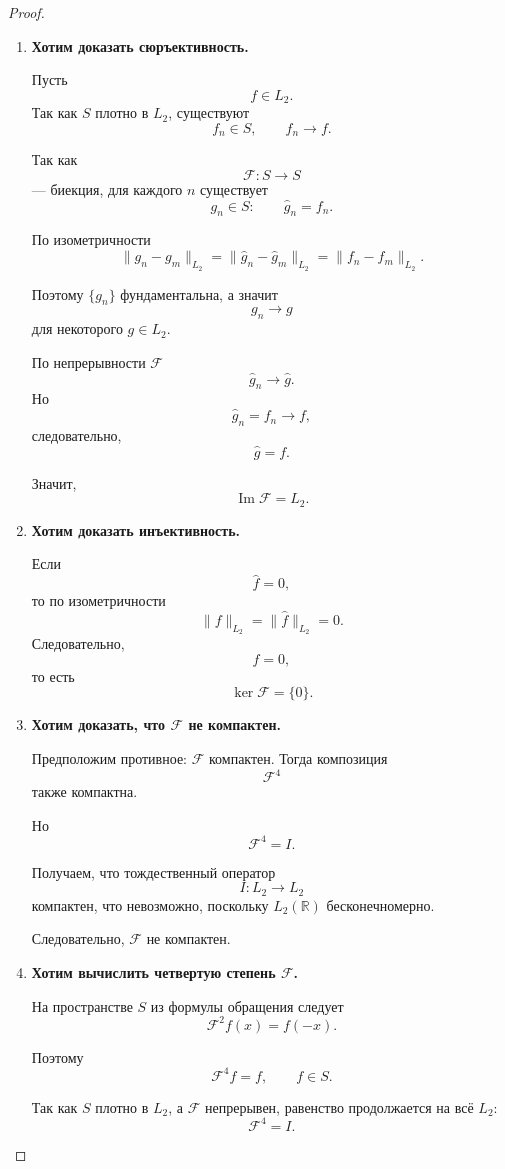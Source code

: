 \begin{proof}
	\begin{enumerate}
		\item
		\textbf{Хотим доказать сюръективность.}
		
		Пусть
		\[
		f\in L_2.
		\]
		Так как \(S\) плотно в \(L_2\), существуют
		\[
		f_n\in S,
		\qquad
		f_n\to f.
		\]
		
		Так как
		\[
		\mathcal F:S\to S
		\]
		--- биекция, для каждого \(n\) существует
		\[
		g_n\in S:
		\qquad
		\widehat g_n=f_n.
		\]
		
		По изометричности
		\[
		\|g_n-g_m\|_{L_2}
		=
		\|\widehat g_n-\widehat g_m\|_{L_2}
		=
		\|f_n-f_m\|_{L_2}.
		\]
		
		Поэтому \(\{g_n\}\) фундаментальна, а значит
		\[
		g_n\to g
		\]
		для некоторого \(g\in L_2\).
		
		По непрерывности \(\mathcal F\)
		\[
		\widehat g_n\to\widehat g.
		\]
		Но
		\[
		\widehat g_n=f_n\to f,
		\]
		следовательно,
		\[
		\widehat g=f.
		\]
		
		Значит,
		\[
		\operatorname{Im}\mathcal F=L_2.
		\]
		
		\item
		\textbf{Хотим доказать инъективность.}
		
		Если
		\[
		\widehat f=0,
		\]
		то по изометричности
		\[
		\|f\|_{L_2}
		=
		\|\widehat f\|_{L_2}
		=
		0.
		\]
		Следовательно,
		\[
		f=0,
		\]
		то есть
		\[
		\ker\mathcal F=\{0\}.
		\]
		
		\item
		\textbf{Хотим доказать, что \(\mathcal F\) не компактен.}
		
		Предположим противное: \(\mathcal F\) компактен.
		Тогда композиция
		\[
		\mathcal F^4
		\]
		также компактна.
		
		Но
		\[
		\mathcal F^4=I.
		\]
		
		Получаем, что тождественный оператор
		\[
		I:L_2\to L_2
		\]
		компактен, что невозможно, поскольку \(L_2(\mathbb R)\)
		бесконечномерно.
		
		Следовательно, \(\mathcal F\) не компактен.
		
		\item
		\textbf{Хотим вычислить четвертую степень \(\mathcal F\).}
		
		На пространстве \(S\) из формулы обращения следует
		\[
		\mathcal F^2f(x)=f(-x).
		\]
		
		Поэтому
		\[
		\mathcal F^4f=f,
		\qquad f\in S.
		\]
		
		Так как \(S\) плотно в \(L_2\), а \(\mathcal F\) непрерывен,
		равенство продолжается на всё \(L_2\):
		\[
		\mathcal F^4=I.
		\]
	\end{enumerate}
\end{proof}

